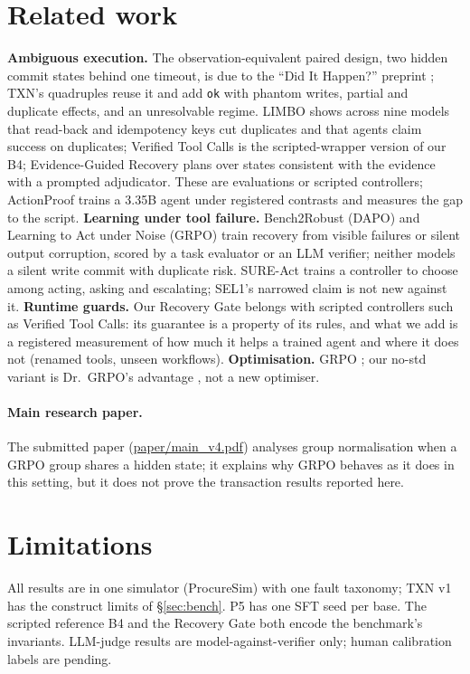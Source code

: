 \documentclass[11pt]{article}
\newcommand{\code}[1]{\texttt{\small #1}}
\begin{document}
\section{Related work}
\label{sec:related}

\textbf{Ambiguous execution.} The observation-equivalent paired design, two hidden commit states behind one timeout,
is due to the ``Did It Happen?'' preprint \citep{didithappen2026}; TXN's quadruples reuse it and add \code{ok} with phantom writes, partial and
duplicate effects, and an unresolvable regime. LIMBO \citep{li2026limbo} shows across nine models that read-back and
idempotency keys cut duplicates and that agents claim success on duplicates; Verified Tool Calls
\citep{mansoor2026verified} is the scripted-wrapper version of our B4; Evidence-Guided Recovery \citep{zhu2026evidence}
plans over states consistent with the evidence with a prompted adjudicator. These are evaluations or scripted
controllers; ActionProof trains a 3.35B agent under registered contrasts and measures the gap to the script.
\textbf{Learning under tool failure.} Bench2Robust \citep{chen2026bench2robust} (DAPO) and Learning to Act under Noise
\citep{chen2026noisyagent} (GRPO) train recovery from visible failures or silent output corruption, scored by a task
evaluator or an LLM verifier; neither models a silent write commit with duplicate risk. SURE-Act
\citep{liu2026sureact} trains a controller to choose among acting, asking and escalating; SEL1's narrowed claim is
not new against it. \textbf{Runtime guards.} Our Recovery Gate belongs with scripted controllers such as Verified Tool
Calls: its guarantee is a property of its rules, and what we add is a registered measurement of how much it helps a
trained agent and where it does not (renamed tools, unseen workflows). \textbf{Optimisation.} GRPO \citep{shao2024deepseekmath}; our no-std variant is Dr.~GRPO's
advantage \citep{liu2025drgrpo}, not a new optimiser.

\paragraph{Main research paper.} The submitted paper (\url{paper/main_v4.pdf}) analyses group normalisation when a GRPO
group shares a hidden state; it explains why GRPO behaves as it does in this setting, but it does not prove the
transaction results reported here.

\section*{Limitations}
All results are in one simulator (ProcureSim) with one fault taxonomy; TXN v1 has the construct limits of
\S\ref{sec:bench}. P5 has one SFT seed per base. The scripted reference B4 and the Recovery Gate both encode the
benchmark's invariants. LLM-judge results are model-against-verifier only; human calibration labels are pending.
\end{document}
